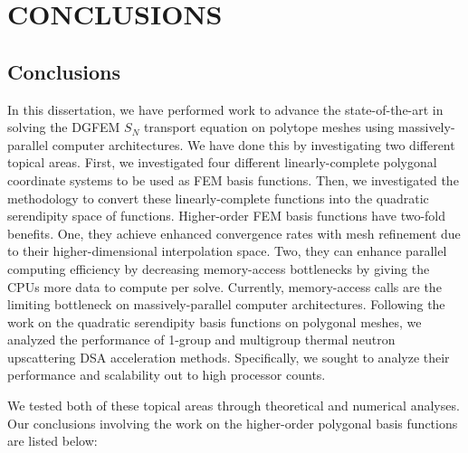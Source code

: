 %
%
%
\chapter{\uppercase {Conclusions}}
\label{sec::Conclusions}


\section{Conclusions}
\label{sec::Conclusions_Conclusions}

In this dissertation, we have performed work to advance the state-of-the-art in solving the DGFEM $S_N$ transport equation on polytope meshes using massively-parallel computer architectures. We have done this by investigating two different topical areas. First, we investigated four different linearly-complete polygonal coordinate systems to be used as FEM basis functions. Then, we investigated the methodology to convert these linearly-complete functions into the quadratic serendipity space of functions. Higher-order FEM basis functions have two-fold benefits. One, they achieve enhanced convergence rates with mesh refinement due to their higher-dimensional interpolation space. Two, they can enhance parallel computing efficiency by decreasing memory-access bottlenecks by giving the CPUs more data to compute per solve. Currently, memory-access calls are the limiting bottleneck on massively-parallel computer architectures. Following the work on the quadratic serendipity basis functions on polygonal meshes, we analyzed the performance of 1-group and multigroup thermal neutron upscattering DSA acceleration methods. Specifically, we sought to analyze their performance and scalability out to high processor counts.

We tested both of these topical areas through theoretical and numerical analyses. Our conclusions involving the work on the higher-order polygonal basis functions are listed below:

